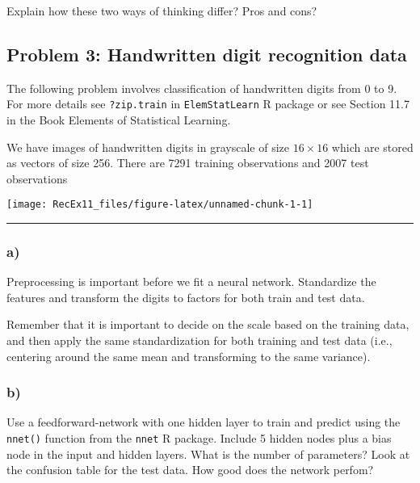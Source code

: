 \documentclass[]{article}
\begin{document}
Explain how these two ways of thinking differ? Pros and cons?

\hypertarget{problem-3-handwritten-digit-recognition-data}{%
\subsection{Problem 3: Handwritten digit recognition
data}\label{problem-3-handwritten-digit-recognition-data}}

The following problem involves classification of handwritten digits from
0 to 9. For more details see \texttt{?zip.train} in
\texttt{ElemStatLearn} R package or see Section 11.7 in the Book
Elements of Statistical Learning.

We have images of handwritten digits in grayscale of size \(16\times16\)
which are stored as vectors of size 256. There are 7291 training
observations and 2007 test observations

\begin{center}\texttt{[image: RecEx11\_files/figure-latex/unnamed-chunk-1-1]} \end{center}

\begin{center}\rule{0.5\linewidth}{0.5pt}\end{center}

\hypertarget{a-2}{%
\subsubsection{a)}\label{a-2}}

Preprocessing is important before we fit a neural network. Standardize
the features and transform the digits to factors for both train and test
data.

Remember that it is important to decide on the scale based on the
training data, and then apply the same standardization for both training
and test data (i.e., centering around the same mean and transforming to
the same variance).

\hypertarget{b-2}{%
\subsubsection{b)}\label{b-2}}

Use a feedforward-network with one hidden layer to train and predict
using the \texttt{nnet()} function from the \texttt{nnet} R package.
Include 5 hidden nodes plus a bias node in the input and hidden layers.
What is the number of parameters? Look at the confusion table for the
test data. How good does the network perfom?
\end{document}
